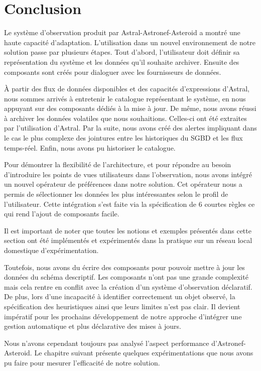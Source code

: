 \section{Conclusion}\label{sec:valid:domvision:conclusion}
Le système d'observation produit par Astral-Astronef-Asteroid a montré une haute capacité d'adaptation. L'utilisation dans un nouvel environnement de notre solution passe par plusieurs étapes. Tout d'abord, l'utilisateur doit définir sa représentation du système et les données qu'il souhaite archiver. Ensuite des composants sont créés pour dialoguer avec les fournisseurs de données. 

À partir des flux de données disponibles et des capacités d'expressions d'Astral, nous sommes arrivés à entretenir le catalogue représentant le système, en nous appuyant sur des composants dédiés à la mise à jour. De même, nous avons réussi à archiver les données volatiles que nous souhaitions. Celles-ci ont été extraites par l'utilisation d'Astral. Par la suite, nous avons créé des alertes impliquant dans le cas le plus complexe des jointures entre les historiques du SGBD et les flux temps-réel. Enfin, nous avons pu historiser le catalogue.

Pour démontrer la flexibilité de l'architecture, et pour répondre au besoin d'introduire les points de vues utilisateurs dans l'observation, nous avons intégré un nouvel opérateur de préférences dans notre solution. Cet opérateur nous a permis de sélectionner les données les plus intéressantes selon le profil de l'utilisateur. Cette intégration s'est faite via la spécification de 6 courtes règles ce qui rend l'ajout de composants facile.

Il est important de noter que toutes les notions et exemples présentés dans cette section ont été implémentés et expérimentés dans la pratique sur un réseau local domestique d'expérimentation.

Toutefois, nous avons du écrire des composants pour pouvoir mettre à jour les données du schéma descriptif. Les composants n'ont pas une grande complexité mais cela rentre en conflit avec la création d'un système d'observation déclaratif. De plus, lors d'une incapacité à identifier correctement un objet observé, la spécification des heuristiques ainsi que leurs limites n'est pas clair. Il devient impératif pour les prochains développement de notre approche d'intégrer une gestion automatique et plus déclarative des mises à jours.

Nous n'avons cependant toujours pas analysé l'aspect performance d'Astronef-Asteroid. Le chapitre suivant présente quelques expérimentations que nous avons pu faire pour mesurer l'efficacité de notre solution.